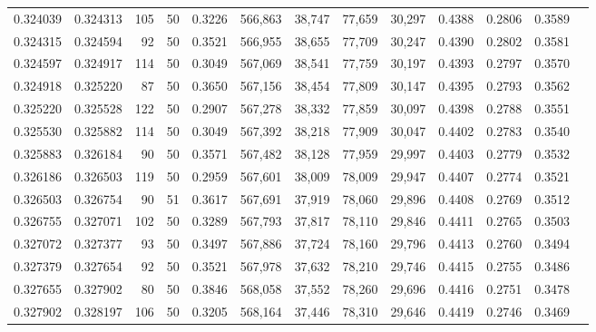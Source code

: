 \begin{tabular}{rrrrrrrrrrrrr}
0.324039 & 0.324313 &   105 &  50 &                                     0.3226 & 566,863 &  38,747 &  77,659 &  30,297 & 0.4388 & 0.2806 & 0.3589 \\
0.324315 & 0.324594 &    92 &  50 &                                     0.3521 & 566,955 &  38,655 &  77,709 &  30,247 & 0.4390 & 0.2802 & 0.3581 \\
0.324597 & 0.324917 &   114 &  50 &                                     0.3049 & 567,069 &  38,541 &  77,759 &  30,197 & 0.4393 & 0.2797 & 0.3570 \\
0.324918 & 0.325220 &    87 &  50 &                                     0.3650 & 567,156 &  38,454 &  77,809 &  30,147 & 0.4395 & 0.2793 & 0.3562 \\
0.325220 & 0.325528 &   122 &  50 &                                     0.2907 & 567,278 &  38,332 &  77,859 &  30,097 & 0.4398 & 0.2788 & 0.3551 \\
0.325530 & 0.325882 &   114 &  50 &                                     0.3049 & 567,392 &  38,218 &  77,909 &  30,047 & 0.4402 & 0.2783 & 0.3540 \\
0.325883 & 0.326184 &    90 &  50 &                                     0.3571 & 567,482 &  38,128 &  77,959 &  29,997 & 0.4403 & 0.2779 & 0.3532 \\
0.326186 & 0.326503 &   119 &  50 &                                     0.2959 & 567,601 &  38,009 &  78,009 &  29,947 & 0.4407 & 0.2774 & 0.3521 \\
0.326503 & 0.326754 &    90 &  51 &                                     0.3617 & 567,691 &  37,919 &  78,060 &  29,896 & 0.4408 & 0.2769 & 0.3512 \\
0.326755 & 0.327071 &   102 &  50 &                                     0.3289 & 567,793 &  37,817 &  78,110 &  29,846 & 0.4411 & 0.2765 & 0.3503 \\
0.327072 & 0.327377 &    93 &  50 &                                     0.3497 & 567,886 &  37,724 &  78,160 &  29,796 & 0.4413 & 0.2760 & 0.3494 \\
0.327379 & 0.327654 &    92 &  50 &                                     0.3521 & 567,978 &  37,632 &  78,210 &  29,746 & 0.4415 & 0.2755 & 0.3486 \\
0.327655 & 0.327902 &    80 &  50 &                                     0.3846 & 568,058 &  37,552 &  78,260 &  29,696 & 0.4416 & 0.2751 & 0.3478 \\
0.327902 & 0.328197 &   106 &  50 &                                     0.3205 & 568,164 &  37,446 &  78,310 &  29,646 & 0.4419 & 0.2746 & 0.3469 \\

\end{tabular}
